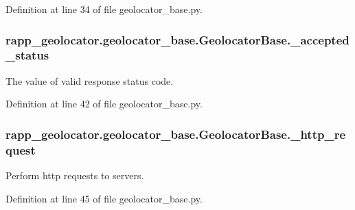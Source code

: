 Definition at line 34 of file geolocator\-\_\-base.\-py.

\hypertarget{classrapp__geolocator_1_1geolocator__base_1_1GeolocatorBase_a2b470a5fd81cbe88922bce9127c1cdae}{
\subsubsection[{\-\_\-accepted\-\_\-status}]{\setlength{\rightskip}{0pt plus 5cm}rapp\-\_\-geolocator.\-geolocator\-\_\-base.\-Geolocator\-Base.\-\_\-accepted\-\_\-status\hspace{0.3cm}{\ttfamily [private]}}}\label{classrapp__geolocator_1_1geolocator__base_1_1GeolocatorBase_a2b470a5fd81cbe88922bce9127c1cdae}


The value of valid response status code. 



Definition at line 42 of file geolocator\-\_\-base.\-py.

\hypertarget{classrapp__geolocator_1_1geolocator__base_1_1GeolocatorBase_ab869b505130380af18703a32ca5982ed}{
\subsubsection[{\-\_\-http\-\_\-request}]{\setlength{\rightskip}{0pt plus 5cm}rapp\-\_\-geolocator.\-geolocator\-\_\-base.\-Geolocator\-Base.\-\_\-http\-\_\-request\hspace{0.3cm}{\ttfamily [private]}}}\label{classrapp__geolocator_1_1geolocator__base_1_1GeolocatorBase_ab869b505130380af18703a32ca5982ed}


Perform http requests to servers. 



Definition at line 45 of file geolocator\-\_\-base.\-py.

